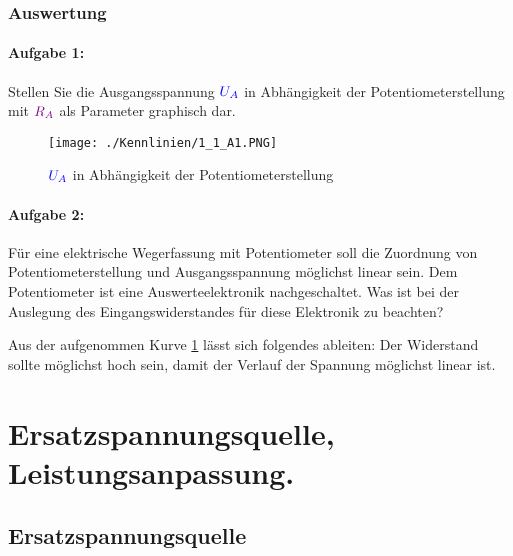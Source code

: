 \documentclass[a4paper,titlepage,parskip]{scrreprt}
\newcommand{\spannung}[1]{\textcolor{blue}{#1}}
\newcommand{\widerstand}[1]{\textcolor{violet}{#1}}
\begin{document}
        \subsection{Auswertung}
          \subsubsection{Aufgabe 1:} Stellen Sie die Ausgangsspannung $\spannung{U_A}$ in Abhängigkeit der Potentiometerstellung
          mit $\widerstand{R_A}$ als Parameter graphisch dar.
          \begin{figure}[!htbp]
              \begin{center}
                  \texttt{[image: ./Kennlinien/1\_1\_A1.PNG]}
                \end{center}
                \caption{$\spannung{U_A}$ in Abhängigkeit der Potentiometerstellung }
                \label{fig:1_1_A1}
            \end{figure}
           \pagebreak
          \subsubsection{Aufgabe 2:}  Für eine elektrische Wegerfassung mit Potentiometer soll die Zuordnung von Potentiometerstellung und Ausgangsspannung möglichst linear sein. Dem Potentiometer ist eine Auswerteelektronik nachgeschaltet. Was ist bei der Auslegung des Eingangswiderstandes für diese Elektronik zu beachten?

          Aus der aufgenommen Kurve \ref{fig:1_1_A1} lässt sich folgendes ableiten: Der Widerstand sollte möglichst hoch sein, damit der Verlauf der Spannung möglichst linear ist.


    \chapter{Ersatzspannungsquelle, Leistungsanpassung.}


        \section{Ersatzspannungsquelle}
\end{document}

